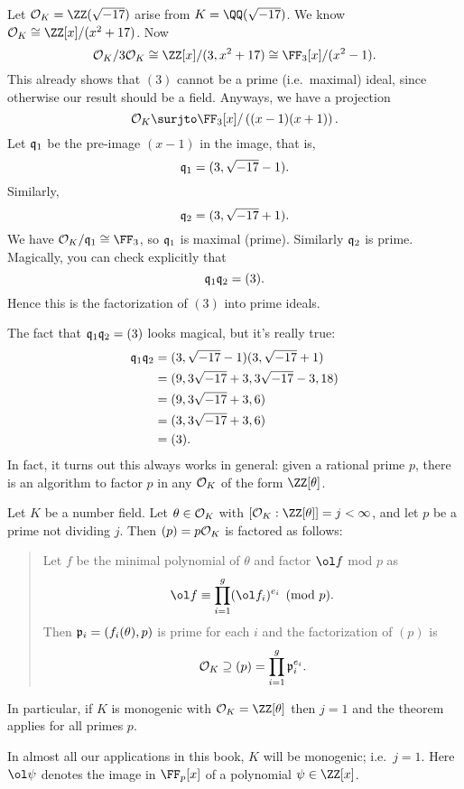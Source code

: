 \begin{example}
	Let $\OO_K = \ZZ(\sqrt{-17})$ arise from $K = \QQ(\sqrt{-17})$.
	We know $\OO_K \cong \ZZ[x] / (x^2+17)$.
	Now 
	\[
		\OO_K / 3\OO_K \cong \ZZ[x] / (3,x^2+17)
		\cong \FF_3[x] / (x^2-1).
	\]
	This already shows that $(3)$ cannot be a prime (i.e.\ maximal) ideal,
	since otherwise our result should be a field.
	Anyways, we have a projection \[ \OO_K \surjto \FF_3[x] / \left( (x-1)(x+1) \right). \]
	Let $\mathfrak q_1$ be the pre-image $(x-1)$ in the image, that is,
	\[ \mathfrak q_1 = (3, \sqrt{-17}-1). \]
	Similarly, \[ \mathfrak q_2 = (3, \sqrt{-17}+1). \]
	We have $\OO_K / \qq_1 \cong \FF_3$, so $\mathfrak q_1$ is maximal (prime).
	Similarly $\mathfrak q_2$ is prime.
	Magically, you can check explicitly that
	\[ \mathfrak q_1 \mathfrak q_2 = (3). \]
	Hence this is the factorization of $(3)$ into prime ideals.
\end{example}

The fact that $\mathfrak q_1 \mathfrak q_2 = (3)$ looks magical, but it's really true:
\begin{align*}
	\mathfrak q_1\mathfrak q_2
	&= (3, \sqrt{-17}-1) (3, \sqrt{-17}+1) \\
	&= (9, 3\sqrt{-17}+3, 3\sqrt{-17}-3, 18) \\
	&= (9, 3\sqrt{-17}+3, 6) \\
	&= (3, 3\sqrt{-17}+3, 6) \\
	&= (3).
\end{align*}
In fact, it turns out this always works in general:
given a rational prime $p$, there is an algorithm
to factor $p$ in any $\mathcal O_K$ of the form $\ZZ[\theta]$.

\begin{theorem}
	\label{thm:factor_alg}
	Let $K$ be a number field.
	Let $\theta \in \mathcal O_K$ with $[\OO_K : \ZZ[\theta]] = j < \infty$,
	and let $p$ be a prime not dividing $j$.
	Then $(p) = p \mathcal O_K$ is factored as follows:
	\begin{quote}
		Let $f$ be the minimal polynomial of $\theta$ and
		factor $\ol f$ mod $p$ as \[ \ol f \equiv \prod_{i=1}^g (\ol f_i)^{e_i} \pmod p. \]
		Then $\mathfrak p_i = (f_i(\theta), p)$ is prime for each $i$
		and the factorization of $(p)$ is
		\[ \mathcal O_K \supseteq (p) = \prod_{i=1}^g \mathfrak p_i^{e_i}. \]
	\end{quote}
	In particular, if $K$ is monogenic with $\OO_K = \ZZ[\theta]$ then $j=1$
	and the theorem applies for all primes $p$.
\end{theorem}
In almost all our applications in this book, $K$ will be monogenic; i.e.\ $j=1$.
Here $\ol \psi$ denotes the image in $\FF_p[x]$ of a polynomial $\psi \in \ZZ[x]$.

